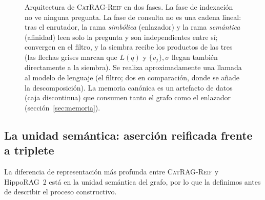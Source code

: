\documentclass[11pt,a4paper]{article}
\newcommand{\sys}{\textsc{CatRAG-Reif}}          %
\newcommand{\hippo}{HippoRAG~2}
\begin{document}
\begin{figure}[t]
\caption{Arquitectura de \sys{} en dos fases. La fase de indexación no ve
ninguna pregunta. La fase de consulta no es una cadena lineal: tras el
enrutador, la rama \emph{simbólica} (enlazador) y la rama \emph{semántica}
(afinidad) leen solo la pregunta y son independientes entre sí; convergen
en el filtro, y la siembra recibe los productos de las tres (las flechas
grises marcan que $L(q)$ y $\{v_j\},\sigma$ llegan también directamente a
la siembra). Se realiza aproximadamente una llamada al modelo de lenguaje
(el filtro; dos en comparación, donde se añade la descomposición). La
memoria canónica es un artefacto de datos (caja discontinua) que consumen
tanto el grafo como el enlazador (sección~\ref{sec:memoria}).}
\label{fig:pipeline}
\end{figure}

\subsection{La unidad semántica: aserción reificada frente a triplete}
\label{sec:asercion}

La diferencia de representación más profunda entre \sys{} y \hippo{} está en
la unidad semántica del grafo, por lo que la definimos antes de describir el
proceso constructivo.
\end{document}
